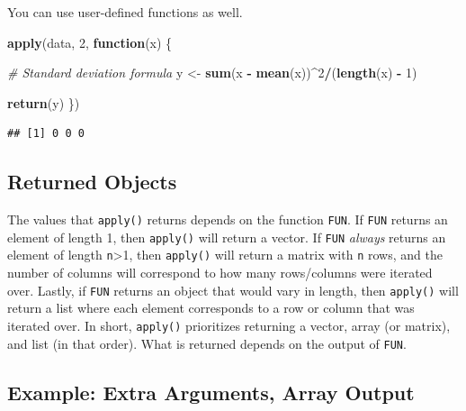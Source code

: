 \documentclass[
]{book}
\newenvironment{Shaded}{\begin{snugshade}}{\end{snugshade}}
\newcommand{\CommentTok}[1]{\textcolor[rgb]{0.56,0.35,0.01}{\textit{#1}}}
\newcommand{\ControlFlowTok}[1]{\textcolor[rgb]{0.13,0.29,0.53}{\textbf{#1}}}
\newcommand{\DecValTok}[1]{\textcolor[rgb]{0.00,0.00,0.81}{#1}}
\newcommand{\KeywordTok}[1]{\textcolor[rgb]{0.13,0.29,0.53}{\textbf{#1}}}
\newcommand{\NormalTok}[1]{#1}
\newcommand{\OperatorTok}[1]{\textcolor[rgb]{0.81,0.36,0.00}{\textbf{#1}}}
\newcommand{\StringTok}[1]{\textcolor[rgb]{0.31,0.60,0.02}{#1}}
\begin{document}
You can use user-defined functions as well.

\begin{Shaded}
\begin{Highlighting}[]
\KeywordTok{apply}\NormalTok{(data, }\DecValTok{2}\NormalTok{, }\ControlFlowTok{function}\NormalTok{(x) \{}

    \CommentTok{# Standard deviation formula}
\NormalTok{    y <-}\StringTok{ }\KeywordTok{sum}\NormalTok{(x }\OperatorTok{-}\StringTok{ }\KeywordTok{mean}\NormalTok{(x))}\OperatorTok{^}\DecValTok{2}\OperatorTok{/}\NormalTok{(}\KeywordTok{length}\NormalTok{(x) }\OperatorTok{-}\StringTok{ }\DecValTok{1}\NormalTok{)}

    \KeywordTok{return}\NormalTok{(y)}
\NormalTok{\})}
\end{Highlighting}
\end{Shaded}

\begin{verbatim}
## [1] 0 0 0
\end{verbatim}

\hypertarget{returned-objects}{%
\subsection{Returned Objects}\label{returned-objects}}

The values that \texttt{apply()} returns depends on the function \texttt{FUN}. If \texttt{FUN} returns an element of length 1, then \texttt{apply()} will return a vector. If \texttt{FUN} \emph{always} returns an element of length \texttt{n}\textgreater1, then \texttt{apply()} will return a matrix with \texttt{n} rows, and the number of columns will correspond to how many rows/columns were iterated over. Lastly, if \texttt{FUN} returns an object that would vary in length, then \texttt{apply()} will return a list where each element corresponds to a row or column that was iterated over. In short, \texttt{apply()} prioritizes returning a vector, array (or matrix), and list (in that order). What is returned depends on the output of \texttt{FUN}.

\hypertarget{example-extra-arguments-array-output}{%
\subsection{Example: Extra Arguments, Array Output}\label{example-extra-arguments-array-output}}
\end{document}
